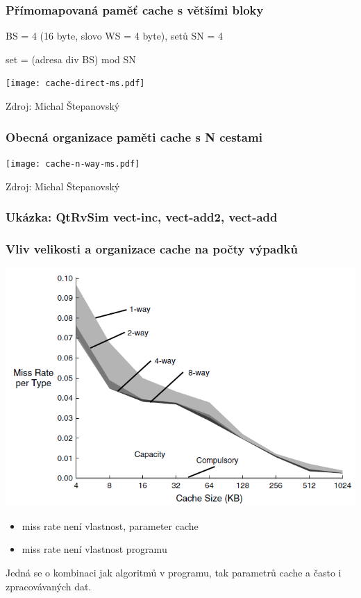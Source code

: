 \documentclass{beamer}
\begin{document}
\begin{frame}
\frametitle{Přímomapovaná paměť cache s většími bloky}

BS = 4 (16 byte, slovo WS = 4 byte), setů SN = 4

set = (adresa div BS) mod SN

{
\centering

\texttt{[image: cache-direct-ms.pdf]}

}

{\tiny Zdroj: Michal Štepanovský}
\end{frame}

\begin{frame}
\frametitle{Obecná organizace paměti cache s N cestami}

{
\centering

\texttt{[image: cache-n-way-ms.pdf]}

}

{\tiny Zdroj: Michal Štepanovský}

\end{frame}

\begin{frame}
\frametitle{Ukázka: QtRvSim vect-inc, vect-add2, vect-add}

\end{frame}

\begin{frame}
\frametitle{Vliv velikosti a organizace cache na počty výpadků}

{
\centering

\includegraphics[width=0.65\linewidth]{fig/cache-size-vs-ways.png}

}

\begin{itemize}
\item miss rate není vlastnost, parameter cache
\item miss rate není vlastnost programu
\end{itemize}

Jedná se o kombinaci jak algoritmů v programu, tak parametrů cache a často i zpracovávaných dat.

\end{frame}
\end{document}
